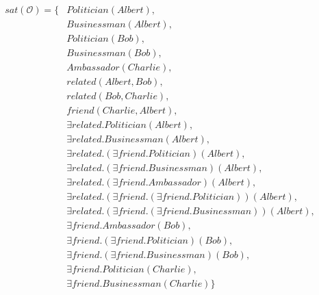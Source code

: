 \begin{equation*}
    \begin{aligned}
        sat(\mathcal{O}) = \{ & Politician(Albert),      \\
                              & Businessman(Albert),     \\
                              & Politician(Bob),         \\
                              & Businessman(Bob),        \\
                              & Ambassador(Charlie),     \\
                              & related(Albert, Bob),    \\
                              & related(Bob, Charlie),   \\ 
                              & friend(Charlie, Albert), \\
                              & \exists related.Politician(Albert),  \\
                              & \exists related.Businessman(Albert), \\
                              & \exists related.(\exists friend.Politician)(Albert),  \\
                              & \exists related.(\exists friend.Businessman)(Albert), \\
                              & \exists related.(\exists friend.Ambassador)(Albert),  \\
                              & \exists related.(\exists friend.(\exists friend.Politician))(Albert),  \\
                              & \exists related.(\exists friend.(\exists friend.Businessman))(Albert), \\
                              & \exists friend.Ambassador(Bob), \\
                              & \exists friend.(\exists friend.Politician)(Bob),  \\
                              & \exists friend.(\exists friend.Businessman)(Bob), \\
                              & \exists friend.Politician(Charlie), \\
                              & \exists friend.Businessman(Charlie) \} 
    \end{aligned}
\end{equation*}
